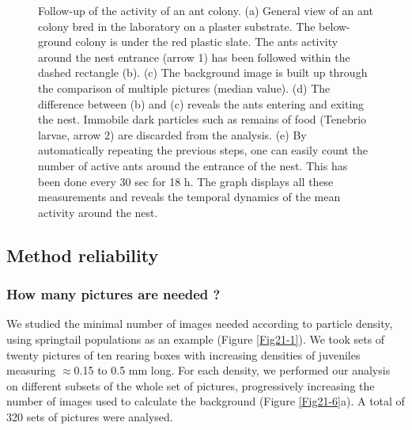 \begin{figure}[!ht]
\caption[ Follow-up of the activity of an ant colony]{ Follow-up of the activity of an ant colony. (a) General view of an ant colony
bred in the laboratory on a plaster substrate. The below-ground colony is under
the red plastic slate. The ants activity around the nest entrance (arrow 1) has
been followed within the dashed rectangle (b). (c) The background image is built
up through the comparison of multiple pictures (median value). (d) The
difference between (b) and (c) reveals the ants entering and exiting the nest.
Immobile dark particles such as remains of food (Tenebrio larvae, arrow 2) are
discarded from the analysis. (e) By automatically repeating the previous steps,
one can easily count the number of active ants around the entrance of the nest.
This has been done every 30 sec for 18 h. The graph displays all these
measurements and reveals the temporal dynamics of the mean activity around the
nest.
}
\label{Fig21-5}
\end{figure}


\subsection{Method reliability}

\subsubsection{How many pictures are needed ?}

We studied the minimal number of images needed according to particle density,
using springtail populations as an example (Figure \ref{Fig21-1}). We took sets of twenty
pictures of ten rearing boxes with increasing densities of juveniles measuring
$\approx$0.15 to 0.5 mm long. For each density, we performed our analysis on different
subsets of the whole set of pictures, progressively increasing the number of
images used to calculate the background (Figure \ref{Fig21-6}a). A total of 320 sets of
pictures were analysed.

